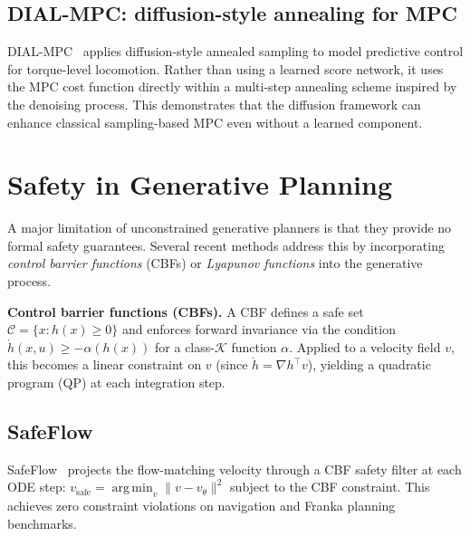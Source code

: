 \documentclass[11pt,letterpaper]{article}
\theoremstyle{plain}
\theoremstyle{definition}
\theoremstyle{remark}
\newcommand{\grad}{\nabla}
\newcommand{\norm}[1]{\lVert #1\rVert}
\DeclareMathOperator*{\argmin}{arg\,min}
\begin{document}
\subsection{DIAL-MPC: diffusion-style annealing for MPC}

DIAL-MPC~\citep{dialmpc} applies diffusion-style annealed sampling to
model predictive control for torque-level locomotion.  Rather than using
a learned score network, it uses the MPC cost function directly within
a multi-step annealing scheme inspired by the denoising process.  This
demonstrates that the diffusion framework can enhance classical
sampling-based MPC even without a learned component.

\section{Safety in Generative Planning}\label{sec:safety}

A major limitation of unconstrained generative planners is that they
provide no formal safety guarantees.  Several recent methods address
this by incorporating \emph{control barrier functions} (CBFs) or
\emph{Lyapunov functions} into the generative process.

\textbf{Control barrier functions (CBFs).}
A CBF defines a safe set $\mathcal{C}=\{x:h(x)\ge 0\}$ and enforces
forward invariance via the condition
$\dot h(x,u)\ge-\alpha(h(x))$ for a class-$\mathcal{K}$ function
$\alpha$.  Applied to a velocity field $v$, this becomes a linear
constraint on $v$ (since $\dot h=\grad h^\top v$), yielding a
quadratic program (QP) at each integration step.

\subsection{SafeFlow}

SafeFlow~\citep{safeflow} projects the flow-matching velocity through a
CBF safety filter at each ODE step:
$v_\text{safe}=\argmin_v\norm{v-v_\theta}^2$ subject to the CBF
constraint.  This achieves zero constraint violations on navigation and
Franka planning benchmarks.
\end{document}
